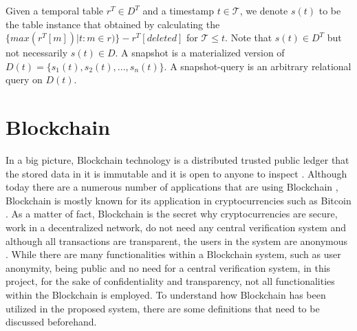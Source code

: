 		\begin{defn} 
			Given a temporal table $r^T \in D^T$ and a timestamp $t \in \mathcal{T}$, we denote $s(t)$ to be the table instance that obtained by calculating the $\{max(r^T[m])|t : m\in r)\}-r^T[deleted]$ for $\mathcal{T}\leq t$. Note that $s(t) \in D^T$ but not necessarily $s(t) \in D$. A snapshot is a materialized version of $D(t) = \{s_1(t),s_2(t),...,s_n(t)\}$. A snapshot-query is an arbitrary relational query on $D(t)$.
		\label{dfn:snapshot}
		\end{defn}


	\section{Blockchain} \label{sec:blockchain}
		In a big picture, Blockchain technology is a distributed trusted public ledger that the stored data in it is immutable and it is open to anyone to inspect \cite{OECD2016Science}. Although today there are a numerous number of applications that are using Blockchain \cite{dhillon2017blockchain},  ‌Blockchain is mostly known for its application in cryptocurrencies such as Bitcoin \cite{nakamoto2008bitcoin}. As a matter of fact, Blockchain is the secret why cryptocurrencies are secure, work in a decentralized network, do not need any central verification system and although all transactions are transparent, the users in the system are anonymous \cite{halaburda2016beyond}.
		While there are many functionalities within a Blockchain system, such as user anonymity, being public and no need for a central verification system, in this project, for the sake of confidentiality and transparency, not all functionalities within the Blockchain is employed. To understand how Blockchain has been utilized in the proposed system, there are some definitions that need to be discussed beforehand.

